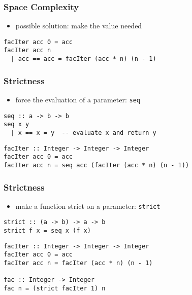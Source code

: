 \documentclass[dvipsnames]{beamer}
\theoremstyle{plain}
\begin{document}
\begin{frame}[fragile]
  \frametitle{Space Complexity}

  \begin{itemize}
    \item possible solution: make the value needed
  \end{itemize}

  \begin{exampleblock}{}
    \begin{lstlisting}
facIter acc 0 = acc
facIter acc n
  | acc == acc = facIter (acc * n) (n - 1)
    \end{lstlisting}
  \end{exampleblock}
\end{frame}

\begin{frame}[fragile]
  \frametitle{Strictness}

  \begin{itemize}
    \item force the evaluation of a parameter:
      \lstinline|seq|
  \end{itemize}

  \begin{exampleblock}{}
    \begin{lstlisting}
seq :: a -> b -> b
seq x y
  | x == x = y  -- evaluate x and return y
    \end{lstlisting}

    \pause
    \medskip
    \begin{lstlisting}
facIter :: Integer -> Integer -> Integer
facIter acc 0 = acc
facIter acc n = seq acc (facIter (acc * n) (n - 1))
    \end{lstlisting}
  \end{exampleblock}
\end{frame}

\begin{frame}[fragile]
  \frametitle{Strictness}

  \begin{itemize}
    \item make a function strict on a parameter:
      \lstinline|strict|
  \end{itemize}

  \begin{exampleblock}{}
    \begin{lstlisting}
strict :: (a -> b) -> a -> b
strict f x = seq x (f x)
    \end{lstlisting}

    \pause
    \medskip
    \begin{lstlisting}
facIter :: Integer -> Integer -> Integer
facIter acc 0 = acc
facIter acc n = facIter (acc * n) (n - 1)

fac :: Integer -> Integer
fac n = (strict facIter 1) n
    \end{lstlisting}
  \end{exampleblock}
\end{frame}
\end{document}
